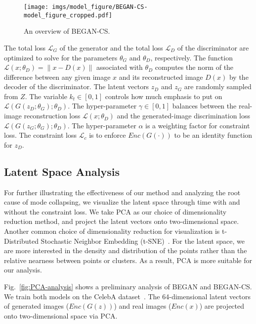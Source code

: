 \documentclass[runningheads]{llncs}
\begin{document}
    \begin{figure}[!t]
        \texttt{[image: imgs/model\_figure/BEGAN-CS-model\_figure\_cropped.pdf]}
        \caption{An overview of BEGAN-CS.}
        \label{fig:full-architecture}
    \end{figure}
    
    \noindent
    The total loss $\mathcal{L}_G$ of the generator and the total loss $\mathcal{L}_D$ of the discriminator are optimized to solve for the parameters $\theta_G$ and $\theta_D$, respectively. The function $\mathcal{L}(x;\theta_D) = \lVert x - D(x) \rVert$ associated with $\theta_D$ computes the norm of the difference between any given image $x$ and its reconstructed image $D(x)$ by the decoder of the discriminator. The latent vectors $z_D$ and $z_G$ are randomly sampled from $Z$. The variable $k_t \in [0,1]$ controls how much emphasis to put on $\mathcal{L}(G(z_D;\theta_G);\theta_D)$. The hyper-parameter $\gamma \in [0,1]$ balances between the real-image reconstruction loss $\mathcal{L}(x;\theta_D)$ and the generated-image discrimination loss $\mathcal{L}(G(z_G;\theta_G);\theta_D)$. The hyper-parameter $\alpha$ is a weighting factor for constraint loss. The constraint loss $\mathcal{L}_c$ is to enforce $Enc(G(\cdot))$ to be an identity function for $z_D$.
    
    
    \subsection{Latent Space Analysis}
    \label{subsection:PCA-analysis}
    
    For further illustrating the effectiveness of our method and analyzing the root cause of mode collapsing, we visualize the latent space through time with and without the constraint loss. We take PCA as our choice of dimensionality reduction method, and project the latent vectors onto two-dimensional space. Another common choice of dimensionality reduction for visualization is t-Distributed Stochastic Neighbor Embedding (t-SNE)~\cite{t-SNE}. For the latent space, we are more interested in the density and distribution of the points rather than the relative nearness between points or clusters. As a result, PCA is more suitable for our analysis.
    
    Fig.~\ref{fig:PCA-analysis} shows a preliminary analysis of BEGAN and BEGAN-CS. We train both models on the CelebA dataset~\cite{CelebA}. The 64-dimensional latent vectors of generated images ($Enc(G(z))$) and real images ($Enc(x)$) are projected onto two-dimensional space via PCA. 
    
\end{document}
